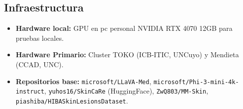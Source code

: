 \documentclass[11pt, a4paper]{article}
\begin{document}
\subsection{Infraestructura}

\begin{itemize}
    \item \textbf{Hardware local:} GPU en pc personal NVIDIA RTX 4070 12GB para pruebas locales.
    \item \textbf{Hardware Primario:} Cluster TOKO (ICB-ITIC, UNCuyo) y Mendieta (CCAD, UNC).
    \item \textbf{Repositorios base:} \texttt{microsoft/LLaVA-Med}, \texttt{microsoft/Phi-3-mini-4k-instruct}, \texttt{yuhos16/SkinCaRe} (HuggingFace), \texttt{ZwQ803/MM-Skin}, \texttt{piashiba/HIBASkinLesionsDataset}.
\end{itemize}

\newpage
\printbibliography[title=Referencias]
\end{document}
